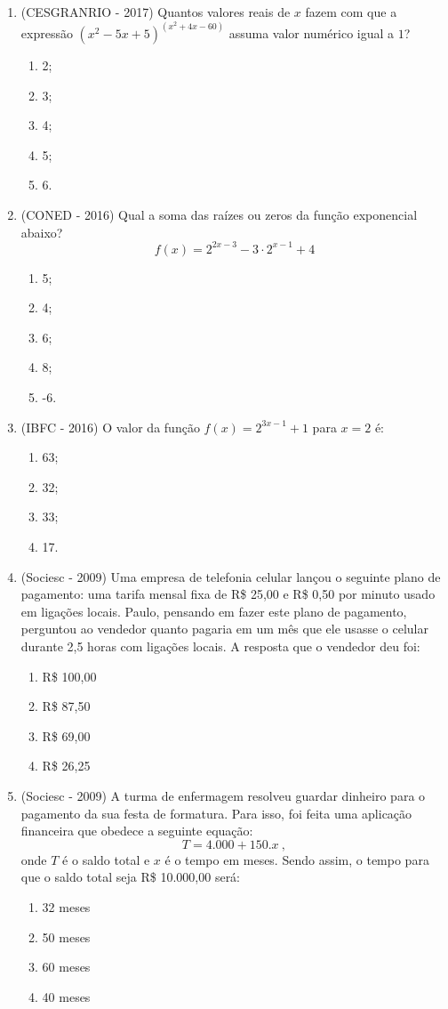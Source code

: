 \begin{enumerate}
\item (CESGRANRIO - 2017) Quantos valores reais de $x$ fazem com que a expressão $(x^2 - 5x + 5)^{(x^2 + 4x - 60)}$ assuma valor numérico igual a $1$?
\begin{enumerate}
\item 2;
\item 3;
\item 4;
\item 5;
\item 6.
\end{enumerate}

\item (CONED - 2016) Qual a soma das raízes ou zeros da função exponencial abaixo?
\[f(x)= 2^{2x-3} - 3 \cdot 2^{x-1} + 4\]

\begin{enumerate}
\item 5;
\item 4;
\item 6;
\item 8;
\item -6.
\end{enumerate}

\item (IBFC - 2016) O valor da função $f(x) = 2^{3x-1} + 1$ para $x = 2$ é:
\begin{enumerate}
\item 63;
\item 32;
\item 33;
\item 17.
\end{enumerate}

 \item (Sociesc - 2009) Uma empresa de telefonia celular lançou o seguinte plano de pagamento: uma tarifa mensal fixa de R\$ 25,00 e R\$ 0,50 por minuto usado em ligações locais. Paulo, pensando em fazer este
 plano de pagamento, perguntou ao vendedor quanto pagaria em um mês que ele usasse o celular durante 2,5 horas com ligações locais. A
 resposta que o vendedor deu foi:
 \begin{enumerate}
  \item R\$ 100,00
  \item R\$ 87,50
  \item R\$ 69,00
  \item R\$ 26,25
 \end{enumerate}

 \item (Sociesc - 2009) A turma de enfermagem resolveu guardar dinheiro para o pagamento da sua festa de formatura. Para isso, foi feita uma aplicação financeira que obedece a seguinte equação:
  \[T = 4.000 + 150.x \ ,\]
  onde $T$ é o saldo total e $x$ é o tempo em meses. Sendo assim, o tempo para que o saldo total seja R\$ 10.000,00 será:
  \begin{enumerate}
  \item 32 meses
  \item 50 meses
  \item 60 meses
  \item 40 meses
 \end{enumerate}


\end{enumerate}

